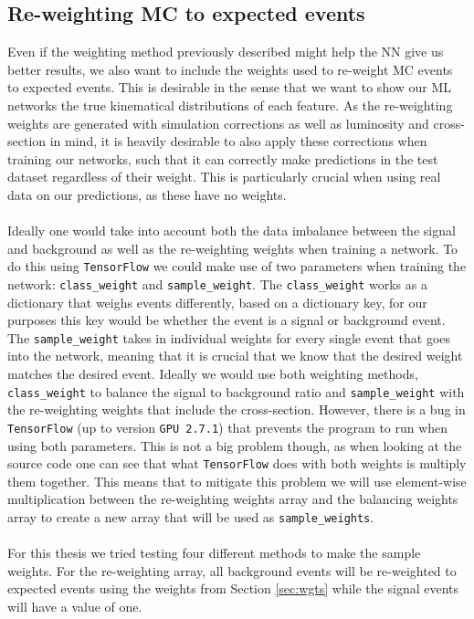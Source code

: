 \documentclass[12pt, a4paper]{book}
\begin{document}
\subsection{Re-weighting MC to expected events}\label{sec:sample_wgts_NN}
Even if the weighting method previously described might help the NN give us better results, we also want to include the weights used to re-weight MC events to expected events. This is desirable in the sense that we want to show our ML networks the true kinematical distributions of each feature.
As the re-weighting weights are generated with simulation corrections as well as luminosity and cross-section in mind, it is heavily desirable to also apply these corrections when training our networks, such that it can correctly make predictions in the test dataset regardless of their weight. This is particularly 
crucial when using real data on our predictions, as these have no weights.\\
\\Ideally one would take into account both the data imbalance between the signal and background as well as the re-weighting weights when training a network. To do this using \verb|TensorFlow| we could make use of two parameters when training the network: \verb|class_weight| and \verb|sample_weight|. The
\verb|class_weight| works as a dictionary that weighs events differently, based on a dictionary key, for our purposes this key would be whether the event is a signal or background event. 
The \verb|sample_weight| takes in individual weights for every single event that goes into the network, meaning that it is crucial that we know that the desired weight matches the desired event. Ideally we would use both weighting methods, \verb|class_weight| to balance the signal to 
background ratio and \verb|sample_weight| with the re-weighting weights that include the cross-section. However, there is a bug in \verb|TensorFlow| (up to version \verb|GPU 2.7.1|) that prevents the program to run when using both parameters. This is not a big problem though, as when looking at the source code \cite{Keras_source_code} 
one can see that what \verb|TensorFlow| does with both weights is multiply them together. This means that to mitigate this problem we will use element-wise multiplication between the re-weighting weights array and the balancing weights array to create a new array that will be used as \verb|sample_weights|. \\
\\For this thesis we tried testing four different methods to make the sample weights. For the re-weighting array, all background events will be re-weighted to expected events using the weights from Section \ref{sec:wgts} while the signal events will have a value of one.  %
\end{document}
